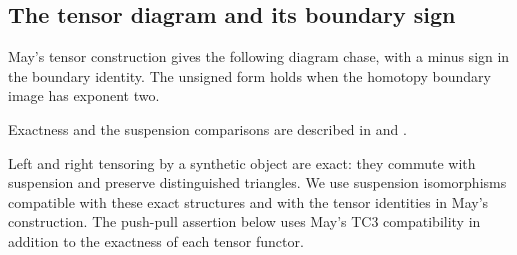\subsection{The tensor diagram and its boundary sign}
May's tensor construction gives the following diagram chase, with a
minus sign in the boundary identity.
The unsigned form holds when the homotopy boundary image has exponent two.

\begin{proposition}
\label{sem:Literature:may-tensor}
Exactness and the suspension comparisons are described in \cite[Proposition 4.2]{Pst} and \cite[Definition 4.1, {\rm(TC1)--(TC2)}]{May01}.\par

Left and right tensoring by a synthetic object are exact: they commute
with suspension and preserve distinguished triangles. We use
suspension isomorphisms compatible with these exact structures and
with the tensor identities in May's construction. The push-pull
assertion below uses May's TC3 compatibility in addition to the
exactness of each tensor functor.


\end{proposition}


